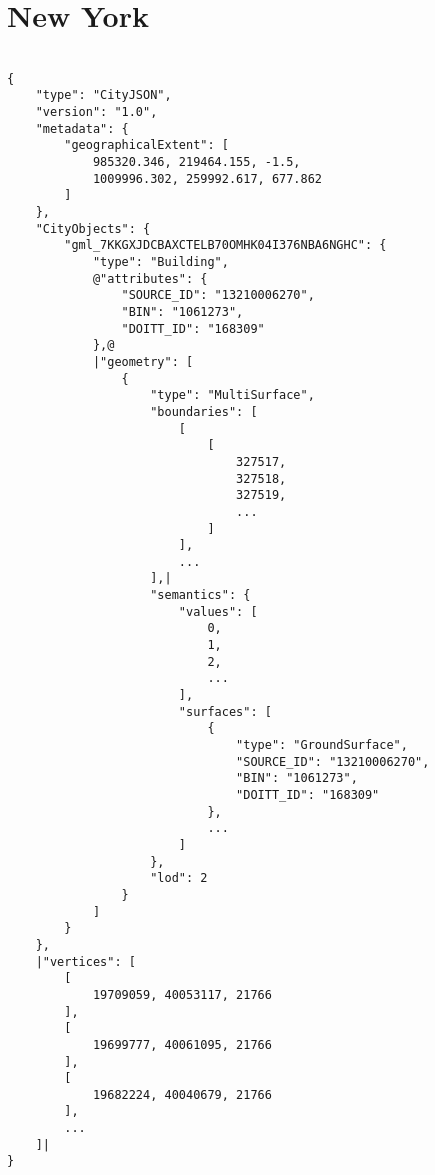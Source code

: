 \section{New York}


\begin{scriptsize}
\begin{minipage}[c]{\linewidth / 1}


\begin{lstlisting}[frame=single,style=base,caption={Snippet of New York dataset}, label=dataset:newyork]

{
    "type": "CityJSON",
    "version": "1.0",
    "metadata": {
        "geographicalExtent": [
            985320.346, 219464.155, -1.5,
            1009996.302, 259992.617, 677.862
        ]
    },
    "CityObjects": {
        "gml_7KKGXJDCBAXCTELB70OMHK04I376NBA6NGHC": {
            "type": "Building",
            @"attributes": {
                "SOURCE_ID": "13210006270",
                "BIN": "1061273",
                "DOITT_ID": "168309"
            },@
            |"geometry": [
                {
                    "type": "MultiSurface",
                    "boundaries": [
                        [
                            [
                                327517,
                                327518,
                                327519,
                                ...
                            ]
                        ],
                        ...
                    ],|
                    "semantics": {
                        "values": [
                            0,
                            1,
                            2,
                            ...
                        ],
                        "surfaces": [
                            {
                                "type": "GroundSurface",
                                "SOURCE_ID": "13210006270",
                                "BIN": "1061273",
                                "DOITT_ID": "168309"
                            },
                            ...
                        ]
                    },
                    "lod": 2
                }
            ]
        }
    },
    |"vertices": [
        [
            19709059, 40053117, 21766
        ],
        [
            19699777, 40061095, 21766
        ],
        [
            19682224, 40040679, 21766
        ],
        ...
    ]|
}

\end{lstlisting}


\end{minipage}
\end{scriptsize}


